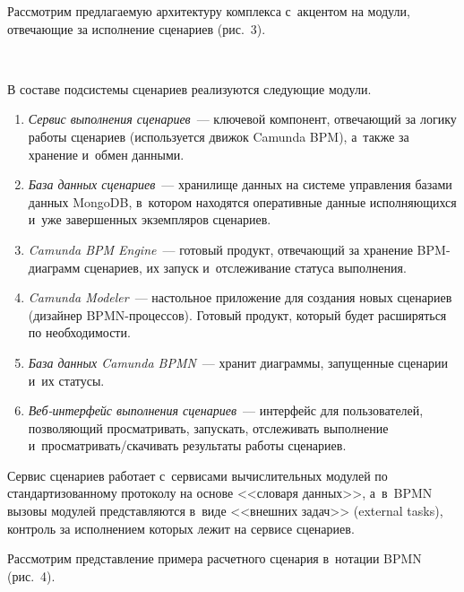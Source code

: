 \begin{multicols}{2}
   Рассмотрим предлагаемую архитектуру комплекса с~акцентом на модули, 
от\-ве\-ча\-ющие за исполнение сценариев (рис.~3).
   
\begin{figure*} %
 \vspace*{1pt}
  \begin{center}  
    \mbox{%
\epsfxsize=161.899mm
}

\end{center}
\vspace*{-9pt}
\end{figure*}

   В составе подсистемы сценариев реализуются следующие модули.
   \begin{enumerate}[1.]
\item \textit{Сервис выполнения сценариев}~--- ключевой компонент, 
отвечающий за логику работы сценариев (используется движок Camunda 
BPM), а~также за хранение и~обмен данными.
\item \textit{База данных сценариев}~--- хранилище данных на сис\-те\-ме управ\-ле\-ния базами данных 
MongoDB, в~котором находятся оперативные данные исполняющихся и~уже 
завершенных экземпляров сценариев.
\item \textit{Camunda BPM Engine}~--- готовый продукт, отвечающий за 
хранение BPM-диа\-грамм сценариев, их запуск и~отслеживание статуса 
выполнения.
\item \textit{Camunda Modeler}~--- настольное приложение для создания новых 
сценариев (дизайнер BPMN-про\-цес\-сов). Готовый продукт, который будет 
расширяться по необходимости.
\item \textit{База данных Camunda BPMN}~--- хранит диаграммы, запущенные 
сценарии и~их статусы.
\item \textit{Веб-интерфейс выполнения сценариев}~--- интерфейс для 
пользователей, позволяющий про\-смат\-ри\-вать, запускать, отслеживать 
выполнение и~про\-смат\-ри\-вать/ска\-чи\-вать результаты \mbox{работы} сценариев.
   \end{enumerate}
   
   Сервис сценариев работает с~сервисами вы\-чис\-ли\-тель\-ных модулей по 
стандартизованному протоколу на основе <<словаря данных>>, а~в~BPMN 
вызовы модулей пред\-став\-ля\-ют\-ся в~виде <<внешних задач>> (external tasks), 
контроль за исполнением которых лежит на сервисе сценариев.
   
   Рассмотрим пред\-став\-ле\-ние примера расчетного сценария в~нотации BPMN 
(рис.~4).


\end{multicols}
